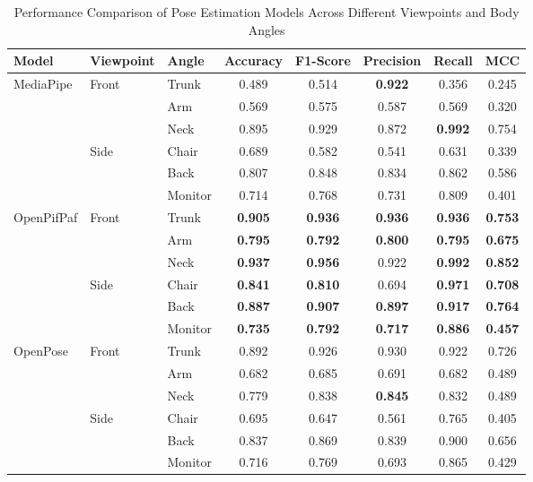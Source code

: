 \documentclass[lettersize,journal]{IEEEtran}
\begin{document}
\begin{table}[ht]
\centering
\caption{Performance Comparison of Pose Estimation Models Across Different Viewpoints and Body Angles}
\label{tab:model_performance}
\small
\begin{tabular}{@{}l l l c c c c c@{}}
\toprule
\textbf{Model} & \textbf{Viewpoint} & \textbf{Angle} & \textbf{Accuracy} & \textbf{F1-Score} & \textbf{Precision} & \textbf{Recall} & \textbf{MCC} \\
\midrule
\multirow{6}{*}{MediaPipe}
& \multirow{3}{*}{Front} & Trunk & 0.489 & 0.514 & \textbf{0.922} & 0.356 & 0.245 \\
& & Arm & 0.569 & 0.575 & 0.587 & 0.569 & 0.320 \\
& & Neck & 0.895 & 0.929 & 0.872 & \textbf{0.992} & 0.754 \\
\cmidrule{2-8}
& \multirow{3}{*}{Side} & Chair & 0.689 & 0.582 & 0.541 & 0.631 & 0.339 \\
& & Back & 0.807 & 0.848 & 0.834 & 0.862 & 0.586 \\
& & Monitor & 0.714 & 0.768 & 0.731 & 0.809 & 0.401 \\
\midrule
\multirow{6}{*}{OpenPifPaf}
& \multirow{3}{*}{Front} & Trunk & \textbf{0.905} & \textbf{0.936} & \textbf{0.936} & \textbf{0.936} & \textbf{0.753} \\
& & Arm & \textbf{0.795} & \textbf{0.792} & \textbf{0.800} & \textbf{0.795} & \textbf{0.675} \\
& & Neck & \textbf{0.937} & \textbf{0.956} & 0.922 & \textbf{0.992} & \textbf{0.852} \\
\cmidrule{2-8}
& \multirow{3}{*}{Side} & Chair & \textbf{0.841} & \textbf{0.810} & 0.694 & \textbf{0.971} & \textbf{0.708} \\
& & Back & \textbf{0.887} & \textbf{0.907} & \textbf{0.897} & \textbf{0.917} & \textbf{0.764} \\
& & Monitor & \textbf{0.735} & \textbf{0.792} & \textbf{0.717} & \textbf{0.886} & \textbf{0.457} \\
\midrule
\multirow{6}{*}{OpenPose}
& \multirow{3}{*}{Front} & Trunk & 0.892 & 0.926 & 0.930 & 0.922 & 0.726 \\
& & Arm & 0.682 & 0.685 & 0.691 & 0.682 & 0.489 \\
& & Neck & 0.779 & 0.838 & \textbf{0.845} & 0.832 & 0.489 \\
\cmidrule{2-8}
& \multirow{3}{*}{Side} & Chair & 0.695 & 0.647 & 0.561 & 0.765 & 0.405 \\
& & Back & 0.837 & 0.869 & 0.839 & 0.900 & 0.656 \\
& & Monitor & 0.716 & 0.769 & 0.693 & 0.865 & 0.429 \\
\bottomrule
\end{tabular}
\end{table}
\end{document}
